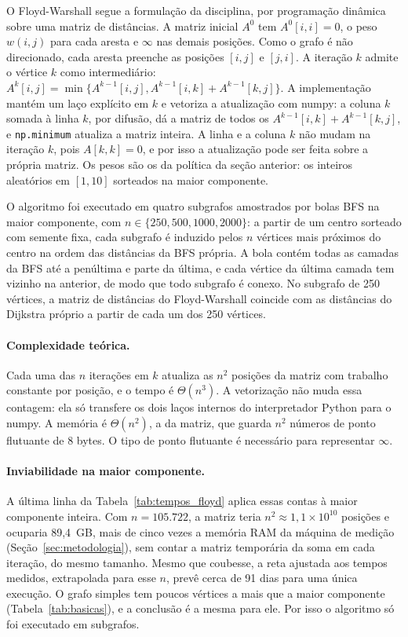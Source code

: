 O Floyd-Warshall segue a formulação da disciplina, por programação dinâmica sobre uma matriz de distâncias. A matriz inicial $A^0$ tem $A^0[i, i] = 0$, o peso $w(i, j)$ para cada aresta e $\infty$ nas demais posições. Como o grafo é não direcionado, cada aresta preenche as posições $[i, j]$ e $[j, i]$. A iteração $k$ admite o vértice $k$ como intermediário: $A^k[i, j] = \min\{A^{k-1}[i, j], A^{k-1}[i, k] + A^{k-1}[k, j]\}$. A implementação mantém um laço explícito em $k$ e vetoriza a atualização com numpy: a coluna $k$ somada à linha $k$, por difusão, dá a matriz de todos os $A^{k-1}[i, k] + A^{k-1}[k, j]$, e \texttt{np.minimum} atualiza a matriz inteira. A linha e a coluna $k$ não mudam na iteração $k$, pois $A[k, k] = 0$, e por isso a atualização pode ser feita sobre a própria matriz. Os pesos são os da política da seção anterior: os inteiros aleatórios em $[1, 10]$ sorteados na maior componente.

O algoritmo foi executado em quatro subgrafos amostrados por bolas BFS na maior componente, com $n \in \{250, 500, 1000, 2000\}$: a partir de um centro sorteado com semente fixa, cada subgrafo é induzido pelos $n$ vértices mais próximos do centro na ordem das distâncias da BFS própria. A bola contém todas as camadas da BFS até a penúltima e parte da última, e cada vértice da última camada tem vizinho na anterior, de modo que todo subgrafo é conexo. No subgrafo de 250 vértices, a matriz de distâncias do Floyd-Warshall coincide com as distâncias do Dijkstra próprio a partir de cada um dos 250 vértices.

\paragraph{Complexidade teórica.} Cada uma das $n$ iterações em $k$ atualiza as $n^2$ posições da matriz com trabalho constante por posição, e o tempo é $\Theta(n^3)$. A vetorização não muda essa contagem: ela só transfere os dois laços internos do interpretador Python para o numpy. A memória é $\Theta(n^2)$, a da matriz, que guarda $n^2$ números de ponto flutuante de 8 bytes. O tipo de ponto flutuante é necessário para representar $\infty$.

\paragraph{Inviabilidade na maior componente.} A última linha da Tabela~\ref{tab:tempos_floyd} aplica essas contas à maior componente inteira. Com $n = 105.722$, a matriz teria $n^2 \approx 1{,}1 \times 10^{10}$ posições e ocuparia 89,4~GB, mais de cinco vezes a memória RAM da máquina de medição (Seção~\ref{sec:metodologia}), sem contar a matriz temporária da soma em cada iteração, do mesmo tamanho. Mesmo que coubesse, a reta ajustada aos tempos medidos, extrapolada para esse $n$, prevê cerca de 91 dias para uma única execução. O grafo simples tem poucos vértices a mais que a maior componente (Tabela~\ref{tab:basicas}), e a conclusão é a mesma para ele. Por isso o algoritmo só foi executado em subgrafos.

